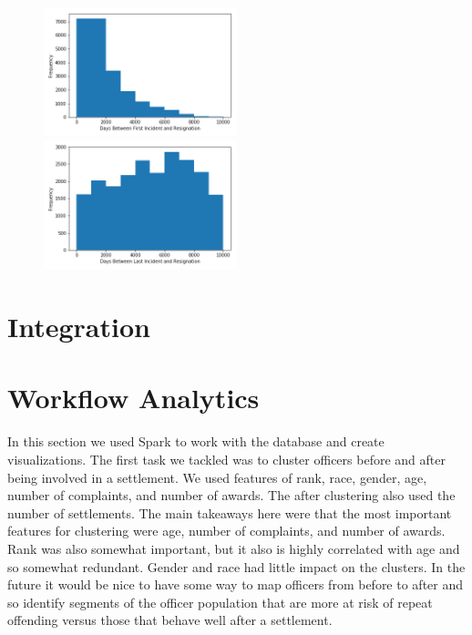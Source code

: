 \documentclass[11pt]{article}
\begin{document}
\begin{figure}[h!]
\includegraphics[width=0.5\textwidth]{complaint2.png}
\includegraphics[width=0.5\textwidth]{complaint3.png}
\end{figure}

\FloatBarrier
\section{Integration}


\FloatBarrier
\section{Workflow Analytics}

In this section we used Spark to work with the database and create visualizations. The first task we tackled was to cluster officers before and after being involved in a settlement. We used features of rank, race, gender, age, number of complaints, and number of awards. The after clustering also used the number of settlements. The main takeaways here were that the most important features for clustering were age, number of complaints, and number of awards. Rank was also somewhat important, but it also is highly correlated with age and so somewhat redundant. Gender and race had little impact on the clusters. In the future it would be nice to have some way to map officers from before to after and so identify segments of the officer population that are more at risk of repeat offending versus those that behave well after a settlement.
\end{document}
